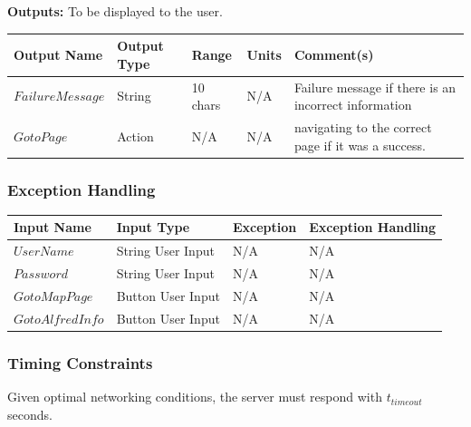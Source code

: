 \documentclass [10pt]{article}
\begin{document}
\textbf{Outputs: } To be displayed to the user.\newline
\begin{longtable}{| p{} | p{} | p{} | p{} | p{} |}\hline 
	\rowcolor{tableCell}\textbf{Output Name} & \textbf{Output Type} & \textbf{Range} & \textbf{Units} & \textbf{Comment(s)} \\ \hline
	$  FailureMessage $ & String & 10 chars & N/A & Failure message if there is an incorrect information  \\ \hline
	\rowcolor{tableCell}$  GotoPage $ & Action & N/A  & N/A & navigating to the correct page if it was a success. \\ \hline
\end{longtable}


\subsubsection{Exception Handling}

\begin{longtable}{|l|l|l|l|}\hline 
	\rowcolor{tableCell}\textbf{Input Name} & \textbf{Input Type} & \textbf{Exception} & \textbf{Exception Handling} \\ \hline
	$  UserName $ & String User Input & N/A & N/A  \\ \hline
	\rowcolor{tableCell}$  Password $ & String User Input & N/A & N/A\\ \hline
	$  GotoMapPage $ & Button User Input & N/A & N/A\\ \hline
	\rowcolor{tableCell}$  GotoAlfredInfo $ & Button User Input & N/A & N/A\\ \hline
\end{longtable}


\subsubsection{Timing Constraints}
Given optimal networking conditions, the server must respond with $ t_{timeout} $ seconds.

\end{document}
